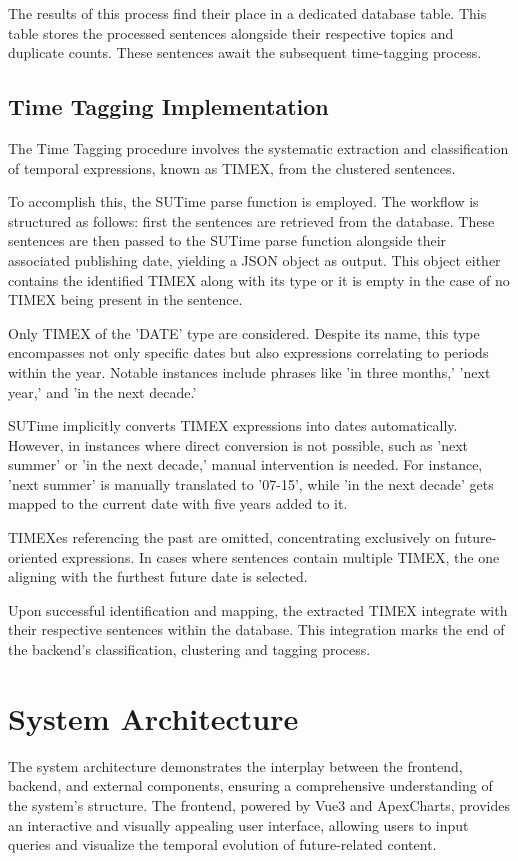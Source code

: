 \documentclass[a4paper,12pt]{report} %
\begin{document}
The results of this process find their place in a dedicated database table. This table stores the processed sentences alongside their respective topics and duplicate counts. These sentences await the subsequent time-tagging process.

\subsection{Time Tagging Implementation}
The Time Tagging procedure involves the systematic extraction and classification of temporal expressions, known as TIMEX, from the clustered sentences.

To accomplish this, the SUTime parse function is employed. The workflow is structured as follows: first the sentences are retrieved from the database. These sentences are then passed to the SUTime parse function alongside their associated publishing date, yielding a JSON object as output. This object either contains the identified TIMEX along with its type or it is empty in the case of no TIMEX being present in the sentence.

Only TIMEX of the 'DATE' type are considered. Despite its name, this type encompasses not only specific dates but also expressions correlating to periods within the year. Notable instances include phrases like 'in three months,' 'next year,' and 'in the next decade.'

SUTime implicitly converts TIMEX expressions into dates automatically. However, in instances where direct conversion is not possible, such as 'next summer' or 'in the next decade,' manual intervention is needed. For instance, 'next summer' is manually translated to '07-15', while 'in the next decade' gets mapped to the current date with five years added to it.

TIMEXes referencing the past are omitted, concentrating exclusively on future-oriented expressions. In cases where sentences contain multiple TIMEX, the one aligning with the furthest future date is selected.

Upon successful identification and mapping, the extracted TIMEX integrate with their respective sentences within the database. This integration marks the end of the backend's classification, clustering and tagging process.

\section{System Architecture}
The system architecture demonstrates the interplay between the frontend, backend, and external components, ensuring a comprehensive understanding of the system's structure. The frontend, powered by Vue3 and ApexCharts, provides an interactive and visually appealing user interface, allowing users to input queries and visualize the temporal evolution of future-related content.
\end{document}
